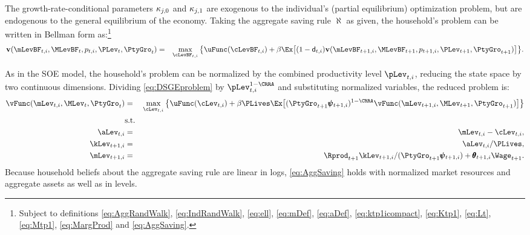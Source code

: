 \documentclass[titlepage]{\econtex}\newcommand{\texname}{cAndCwithStickyE}
\begin{document}
The growth-rate-conditional parameters $\kappa_{j,0}$ and $\kappa_{j,1}$ are exogenous to
the individual's (partial equilibrium) optimization problem, but are endogenous to the general
equilibrium of the economy.  Taking the aggregate saving rule $\aleph$ as given, the household's
problem can be written in Bellman form as:\footnote{Subject to definitions \eqref{eq:AggRandWalk},
\eqref{eq:IndRandWalk}, \eqref{eq:ell}, \eqref{eq:mDef}, \eqref{eq:aDef}, \eqref{eq:ktp1icompact},
\eqref{eq:Ktp1}, \eqref{eq:Lt}, \eqref{eq:Mtp1}, \eqref{eq:MargProd} and \eqref{eq:AggSaving}.}
\begin{eqnarray}
\textbf{v}(\mLevBF_{t,i},\MLevBF_t,p_{t,i},\PLev_t,\PtyGro_t) &=& \max_{\cLevBF_{t,i}} \big\{ \uFunc(\cLevBF_{t,i}) + \beta \Ex\big[(1-\pDies_{t,i})\textbf{v}(\mLevBF_{t+1,i},\MLevBF_{t+1},p_{t+1,i},\PLev_{t+1},\PtyGro_{t+1})\big] \big\}. \nonumber \\ \label{eq:DSGEproblem}
\end{eqnarray}

As in the SOE model, the household's problem can be normalized by the combined productivity level $\pLev_{t,i}$, reducing the state space by two continuous dimensions.  Dividing \eqref{eq:DSGEproblem} by $\pLev_{t,i}^{1-\CRRA}$ and substituting normalized variables, the reduced problem is:
\begin{eqnarray}
\vFunc(\mLev_{t,i},\MLev_t,\PtyGro_t) &=& \max_{\cLev_{t,i}} \big\{ \uFunc(\cLev_{t,i}) + \beta \PLives \Ex\big[(\PtyGro_{t+1} \pmb{\psi}_{t+1,i})^{1-\CRRA}\vFunc(\mLev_{t+1,i},\MLev_{t+1},\PtyGro_{t+1})\big] \big\} \nonumber \\
& \text{s.t.} & \label{eq:DSGEproblemNorm}\\
\aLev_{t,i} & = & \mLev_{t,i} - \cLev_{t,i}, \nonumber \\
\kLev_{t+1,i} & = & \aLev_{t,i}/\PLives, \nonumber \\
\mLev_{t+1,i} & = & \Rprod_{t+1} \kLev_{t+1,i}/(\PtyGro_{t+1}\pmb{\psi}_{t+1,i}) + \pmb{\theta}_{t+1,i} \Wage_{t+1}. \nonumber
\end{eqnarray}
Because household beliefs about the aggregate saving rule are linear in logs, \eqref{eq:AggSaving} holds with normalized market resources and aggregate assets as well as in levels.
\end{document}
